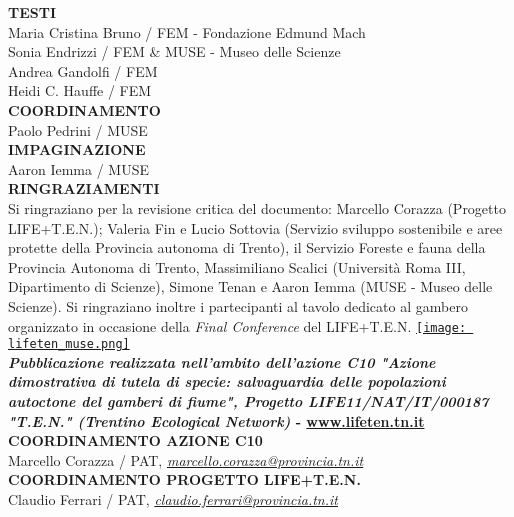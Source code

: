 \documentclass[11pt,a4paper,italian,twoside,openany]{memoir}
\begin{document}
\textbf{\color{veryblue}TESTI} \\
Maria Cristina Bruno / FEM - Fondazione Edmund Mach \\
Sonia Endrizzi / FEM \& MUSE - Museo delle Scienze \\
Andrea Gandolfi / FEM \\
Heidi C. Hauffe / FEM \\
\vspace{.5cm}
\textbf{\color{veryblue}COORDINAMENTO} \\
Paolo Pedrini / MUSE \\
\vspace{.5cm}
\textbf{\color{veryblue}IMPAGINAZIONE}\\
Aaron Iemma / MUSE \\
\vspace{.5cm}
\textbf{\color{veryblue}RINGRAZIAMENTI} \\
Si ringraziano per la revisione critica del documento: Marcello Corazza (Progetto LIFE+T.E.N.); Valeria Fin e Lucio Sottovia (Servizio sviluppo sostenibile e aree protette della Provincia autonoma di Trento), il Servizio Foreste e fauna della Provincia Autonoma di Trento, Massimiliano Scalici (Università Roma III, Dipartimento di Scienze), Simone Tenan e Aaron Iemma (MUSE - Museo delle Scienze). Si ringraziano inoltre i partecipanti al tavolo dedicato al gambero organizzato in occasione della \emph{Final Conference} del LIFE+T.E.N.
\vspace{.5cm}
\href{http://www.lifeten.tn.it/actions/preliminary_actions/pagina8.html}{\texttt{[image: lifeten\_muse.png]}} \\
\textbf{\footnotesize \emph{Pubblicazione realizzata nell'ambito dell'azione C10 "Azione dimostrativa di tutela di specie: salvaguardia delle popolazioni autoctone del gamberi di fiume", Progetto LIFE11/NAT/IT/000187 "T.E.N." (Trentino Ecological Network)} - \url{www.lifeten.tn.it} } \\
\vspace{.5cm}
\textbf{\color{veryblue}COORDINAMENTO AZIONE C10} \\
Marcello Corazza / PAT, \emph{\href{mailto:marcello.corazza@provincia.tn.it}{marcello.corazza@provincia.tn.it}} \\
\vspace{.5cm}
\textbf{\color{veryblue}COORDINAMENTO PROGETTO LIFE+T.E.N.} \\
Claudio Ferrari / PAT, \emph{\href{mailto:claudio.ferrari@provincia.tn.it}{claudio.ferrari@provincia.tn.it}} \\
\vspace{2cm}
\end{document}
